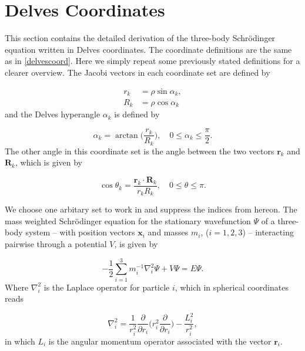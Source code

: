 \chapter{Delves Coordinates}\label{delves}
This section contains the detailed derivation of the three-body Schr{\"o}dinger equation written in Delves coordinates. The coordinate definitions are the same as in \cref{delvescoord}. Here we simply repeat some previously stated definitions for a clearer overview. The Jacobi vectors in each coordinate set are defined by

\begin{subequations}
	\begin{align}
	r_{k} &= \rho \sin{\alpha_{k}},\\
	R_{k} &= \rho \cos{\alpha_{k}}
	\end{align}
\end{subequations}
and the Delves hyperangle $\alpha_{k}$ is defined by

\begin{equation}
\alpha_{k} = \arctan\bigg(\frac{r_{k}}{R_{k}}\bigg), \quad 0\leq \alpha_{k} \leq \frac{\pi}{2}.
\end{equation}
The other angle in this coordinate set is the angle between the two vectors $\mathbf{r}_{k}$ and $\mathbf{R}_{k}$, which is given by

\begin{equation}
\cos{\theta_{k}} = \frac{\mathbf{r}_{k} \cdot \mathbf{R}_{k}}{r_{k} R_{k}}, \quad  0\leq \theta \leq \pi.
\end{equation}

We choose one arbitary set to work in and suppress the indices from hereon. The mass weighted Schr{\"o}dinger equation for the stationary wavefunction $\Psi$ of a three-body system -- with position vectors $\mathbf{x}_i$ and masses $m_i$, ($i=1,2,3$) -- interacting pairwise through a potential $V$, is given by

\begin{equation}
-\frac{1}{2} \sum_{i=1}^{3} m^{-1}_{i} \nabla^{2}_i \Psi + V\Psi = E \Psi. 
\end{equation}
Where $\nabla_i^{2}$ is the Laplace operator for particle $i$, which in spherical coordinates reads

\begin{equation}
\nabla_i^2 = \frac{1}{r_i^{2}}\frac{\partial}{\partial r_i} \bigg(r_i^{2} \frac{\partial}{\partial r_i}\bigg) - \frac{L_i^{2}}{r_i^{2}},
\end{equation}
in which $L_i$ is the angular momentum operator associated with the vector $\mathbf{r}_i$. 

